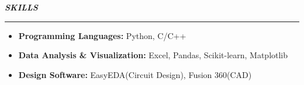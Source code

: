 {\noindent\fontsize{13pt}{16pt}\bfseries\itshape SKILLS\par}
\vspace{0.5em}
\hrule
\vspace{0.7em}

\noindent
\begin{itemize}
    \item \textbf{Programming Languages:} Python, C/C++
    \item \textbf{Data Analysis \& Visualization:} Excel, Pandas, Scikit-learn, Matplotlib
    \item \textbf{Design Software:} EasyEDA(Circuit Design), Fusion 360(CAD)
\end{itemize}
